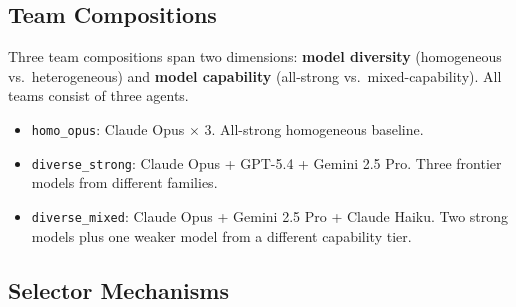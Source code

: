 \documentclass[10pt,twocolumn]{article}
\theoremstyle{remark}
\begin{document}
\begin{table}[t]
  \centering
  \caption{Experimental design. Five cells test specific hypotheses by varying one factor relative to the reference cell. Each cell is evaluated on all 42 tasks ($N = 42$ per cell, $N = 210$ total).}
  \label{tab:design}
\end{table}

\subsection{Team Compositions}

Three team compositions span two dimensions: \textbf{model diversity} (homogeneous vs.\ heterogeneous) and \textbf{model capability} (all-strong vs.\ mixed-capability). All teams consist of three agents.

\begin{itemize}[nosep]
  \item \texttt{homo\_opus}: Claude Opus $\times$ 3. All-strong homogeneous baseline.
  \item \texttt{diverse\_strong}: Claude Opus + GPT-5.4 + Gemini 2.5 Pro. Three frontier models from different families.
  \item \texttt{diverse\_mixed}: Claude Opus + Gemini 2.5 Pro + Claude Haiku. Two strong models plus one weaker model from a different capability tier.
\end{itemize}

\subsection{Selector Mechanisms}
\end{document}
